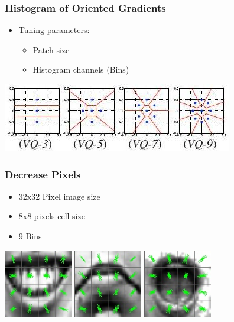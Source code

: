 \documentclass[serif,14pt]{beamer}
\begin{document}
\begin{frame}
  \frametitle{Histogram of Oriented Gradients}
    \begin{itemize}
		\item Tuning parameters:
        	\begin{itemize}
				\item Patch size
				\item Histogram channels (Bins)
			\end{itemize}
	\end{itemize}
        \vspace{0.3cm}
          \centering
      \includegraphics[scale=0.7]{bins.jpg}
\end{frame}

\begin{frame}
  \frametitle{Decrease Pixels}
    \begin{itemize}
		\item 32x32 Pixel image size

				\item 8x8 pixels cell size

				\item 9 Bins
	\end{itemize}
    \vspace{1.0cm}
 \includegraphics[width=3cm,height=3cm]{images/negativeTrain_14_32.jpg}
    \hspace{0.7cm}
\includegraphics[width=3cm,height=3cm]{images/negativeTrain_63_32.jpg}
    \hspace{0.7cm}
\includegraphics[width=3cm,height=3cm]{images/positiveTrain_25_32.jpg}
   

\end{frame}
\end{document}
